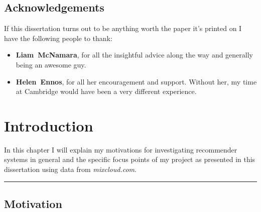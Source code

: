 \documentclass[a4paper,12pt,twoside,notitlepage]{report}
\def\mixurl{\emph{mixcloud.com}}
\newcommand{\rulewidth}{300pt}
\newcommand{\halfrule}{
  \begin{center}
    {\rule{\rulewidth}{0.5pt}}
  \end{center}}
\begin{document}

\section*{Acknowledgements}

If this dissertation turns out to be anything worth the paper it's printed on I
have the following people to thank:

\begin{itemize}
 \item {\bf Liam~McNamara}, for all the insightful advice along the way and
generally being an awesome guy.
 \item {\bf Helen~Ennos}, for all her encouragement and support. Without her, my
time at Cambridge would have been a very different experience. 
\end{itemize}

\cleardoublepage

\tableofcontents
\clearpage

\clearpage
\listoffigures

\clearpage
\listoftables

\clearpage
\lstlistoflistings

\cleardoublepage



\setcounter{page}{1}
\setcounter{chapter}{0}
\pagestyle{headings}


\chapter{Introduction}


In this chapter I will explain my motivations for investigating recommender
systems in general and the specific focus points of my project as
presented in this dissertation using data from \mixurl.

\halfrule

\section{Motivation}
\end{document}
